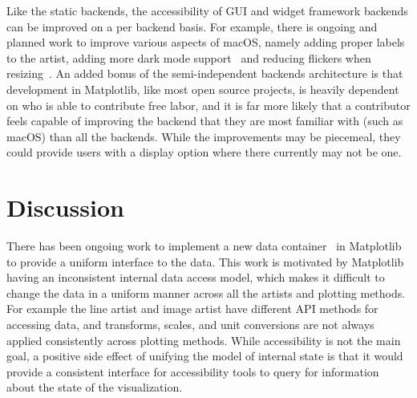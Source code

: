 \documentclass{vgtc}                          %
\begin{document}
Like the static backends, the accessibility of GUI and widget framework backends can be improved on a per backend basis. For example, there is ongoing and planned work to improve various aspects of macOS, namely adding proper labels to the artist, adding more dark mode support~\cite{BugMacOSBackenda} and reducing flickers when resizing~\cite{BugMacOSBackend}. An added bonus of the semi-independent backends architecture is that development in Matplotlib, like most open source projects, is heavily dependent on who is able to contribute free labor, and it is far more likely that a contributor feels capable of improving the backend that they are most familiar with (such as macOS) than all the backends. While the improvements may be piecemeal, they could provide users with a display option where there currently may not be one.


\section{Discussion}
There has been ongoing work to implement a new data container~\cite{ProofConceptData} in Matplotlib to provide a uniform interface to the data. This work is motivated by Matplotlib having an inconsistent internal data access model, which makes it difficult to change the data in a uniform manner across all the artists and plotting methods. For example the line artist and image artist have different API methods for accessing data, and transforms, scales, and unit conversions are not always applied consistently across plotting methods. While accessibility is not the main goal, a positive side effect of unifying the model of internal state is that it would provide a consistent interface for accessibility tools to query for information about the state of the visualization. 
\end{document}
